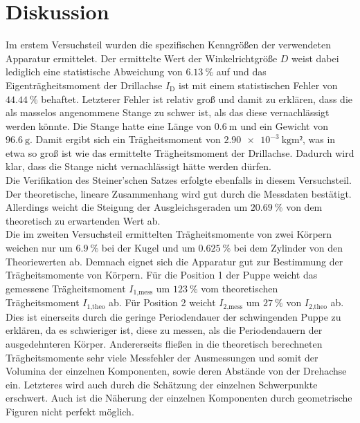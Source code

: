 \section{Diskussion}
\label{sec:Diskussion}

Im erstem Versuchsteil wurden die spezifischen Kenngrößen der verwendeten 
Apparatur ermittelet. Der ermittelte Wert der Winkelrichtgröße $D$ weist dabei 
lediglich eine statistische Abweichung von $\SI{6.13}{\percent}$ auf und das 
Eigenträgheitsmoment der Drillachse $I_\text{D}$ ist mit einem statistischen 
Fehler von $\SI{44.44}{\percent}$ behaftet. Letzterer Fehler ist relativ groß 
und damit zu erklären, dass die als masselos angenommene Stange zu 
schwer ist, als das diese vernachlässigt werden könnte. Die Stange hatte eine 
Länge von $\SI{0.6}{\meter}$ und ein Gewicht von $\SI{96.6}{\gram}$. Damit ergibt
sich ein Trägheitsmoment von $\SI{2.90e-3}{\kilo\gram\meter²}$, was in etwa so groß
ist wie das ermittelte Trägheitsmoment der Drillachse. Dadurch wird klar, dass die
Stange nicht vernachlässigt hätte werden dürfen. \\
Die Verifikation des Steiner’schen Satzes erfolgte ebenfalls in diesem Versuchsteil. Der
theoretische, lineare Zusammenhang wird gut durch die Messdaten bestätigt. Allerdings weicht
die Steigung der Ausgleichsgeraden um $\SI{20.69}{\percent}$ von dem theoretisch zu erwartenden 
Wert ab. \\
Die im zweiten Versuchsteil ermittelten Trägheitsmomente von zwei Körpern weichen nur um
$\SI{6.9}{\percent}$ bei der Kugel und um $\SI{0.625}{\percent}$ bei dem Zylinder von den 
Theoriewerten ab. Demnach eignet sich die Apparatur gut zur Bestimmung der Trägheitsmomente
von Körpern. 
Für die Position 1 der Puppe weicht das gemessene Trägheitsmoment $I_\text{1,mess}$ um 
$\SI{123}{\percent}$ vom theoretischen Trägheitsmoment $I_\text{1,theo}$ ab. Für Position 2
weicht $I_\text{2,mess}$ um $\SI{27}{\percent}$ von $I_\text{2,theo}$ ab.
Dies ist einerseits durch die geringe Periodendauer der schwingenden Puppe zu erklären,
da es schwieriger ist, diese zu messen, als die Periodendauern der ausgedehnteren Körper.
Andererseits fließen in die theoretisch berechneten Trägheitsmomente sehr viele Messfehler
der Ausmessungen und somit der Volumina der einzelnen Komponenten, sowie deren Abstände 
von der Drehachse ein.
Letzteres wird auch durch die Schätzung der einzelnen Schwerpunkte erschwert. 
Auch ist die Näherung der einzelnen Komponenten durch geometrische Figuren nicht
perfekt möglich.
